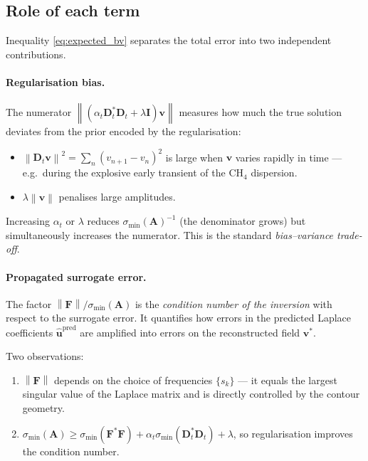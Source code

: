 \documentclass[11pt, a4paper]{article}
\newcommand{\norm}[1]{\left\|#1\right\|}
\begin{document}
\subsection{Role of each term}

Inequality \eqref{eq:expected_bv} separates the total error into two
independent contributions.

\paragraph{Regularisation bias.}
The numerator $\norm{(\alpha_t\mathbf{D}_t^*\mathbf{D}_t + \lambda\mathbf{I})\mathbf{v}}$
measures how much the true solution deviates from the prior encoded by the
regularisation:
\begin{itemize}
  \item $\norm{\mathbf{D}_t\mathbf{v}}^2 = \sum_n (v_{n+1}-v_n)^2$ is large when
        $\mathbf{v}$ varies rapidly in time --- e.g.\ during the explosive
        early transient of the CH$_4$ dispersion.
  \item $\lambda\norm{\mathbf{v}}$ penalises large amplitudes.
\end{itemize}
Increasing $\alpha_t$ or $\lambda$ reduces $\sigma_{\min}(\mathbf{A})^{-1}$
(the denominator grows) but simultaneously increases the numerator.
This is the standard \emph{bias--variance trade-off}.

\paragraph{Propagated surrogate error.}
The factor $\norm{\mathbf{F}}/\sigma_{\min}(\mathbf{A})$ is the
\emph{condition number of the inversion} with respect to the surrogate error.
It quantifies how errors in the predicted Laplace coefficients
$\hat{\mathbf{u}}^{\mathrm{pred}}$ are amplified into errors on the
reconstructed field $\mathbf{v}^*$.

Two observations:
\begin{enumerate}
  \item $\norm{\mathbf{F}}$ depends on the choice of frequencies
        $\{s_k\}$ --- it equals the largest singular value of the
        Laplace matrix and is directly controlled by the contour geometry.
  \item $\sigma_{\min}(\mathbf{A}) \geq \sigma_{\min}(\mathbf{F}^*\mathbf{F})
        + \alpha_t\sigma_{\min}(\mathbf{D}_t^*\mathbf{D}_t) + \lambda$,
        so regularisation improves the condition number.
\end{enumerate}
\end{document}
